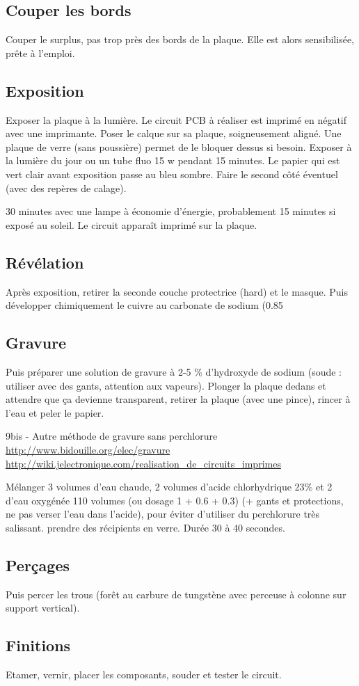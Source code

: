 \subsection{Couper les bords}
Couper le surplus, pas trop près des bords de la plaque.
Elle est alors sensibilisée, prête à l'emploi.

\subsection{Exposition}
Exposer la plaque à la lumière.
Le circuit PCB à réaliser est imprimé en négatif avec une imprimante. Poser le calque sur sa plaque, soigneusement aligné. Une plaque de verre (sans poussière) permet de le bloquer dessus si besoin.
Exposer à la lumière du jour ou un tube fluo 15 w pendant 15 minutes. Le papier qui est vert clair avant exposition passe au bleu sombre.
Faire le second côté éventuel (avec des repères de calage).

30 minutes avec une lampe à économie d'énergie, probablement 15 minutes si exposé au soleil. Le circuit apparaît imprimé sur la plaque.

\subsection{Révélation}

Après exposition, retirer la seconde couche protectrice (hard) et le masque. Puis développer chimiquement le cuivre au carbonate de sodium (0.85 %

\subsection{Gravure}
Puis préparer une solution de gravure à 2-5 \% d'hydroxyde de sodium (soude : utiliser avec des gants, attention aux vapeurs).
Plonger la plaque dedans et attendre que ça devienne transparent, retirer la plaque (avec une pince), rincer à l'eau et peler le papier.

9bis - Autre méthode de gravure sans perchlorure
\url{http://www.bidouille.org/elec/gravure}
\url{http://wiki.jelectronique.com/realisation_de_circuits_imprimes}

Mélanger 3 volumes d'eau chaude, 2 volumes d'acide chlorhydrique 23\% et 2 d'eau oxygénée 110 volumes (ou dosage 1 + 0.6 + 0.3) (+ gants et protections, ne pas verser l'eau dans l'acide), pour éviter d'utiliser du perchlorure très salissant. prendre des récipients en verre. Durée 30 à 40 secondes.

\subsection{Perçages}
Puis percer les trous (forêt au carbure de tungstène avec perceuse à colonne sur support vertical).

\subsection{Finitions}
Etamer, vernir, placer les composants, souder et tester le circuit.